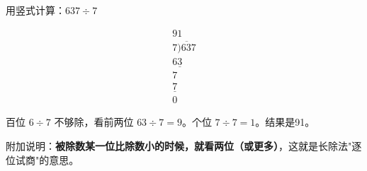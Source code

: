 \begin{example}
用竖式计算：$637\div7$
\end{example}
\begin{solution}
\[
\begin{array}{r}
  91 \\
7\overline{)637} \\
  \underline{63\phantom{0}} \\
   7 \\
  \underline{7} \\
   0
\end{array}
\]

百位 $6\div7$ 不够除，看前两位 $63\div7=9$。个位 $7\div7=1$。结果是91。
\end{solution}

附加说明：\textbf{被除数某一位比除数小的时候，就看两位（或更多）}，这就是长除法"逐位试商"的意思。

